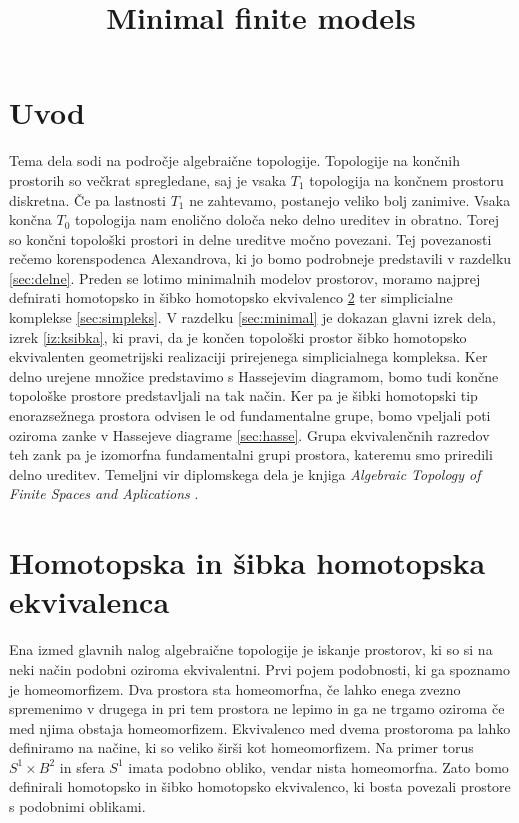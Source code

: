 \documentclass[mat1]{fmfdelo}
\title{Minimal finite models}
\begin{document}
\section{Uvod}

Tema dela sodi na področje algebraične topologije. Topologije na končnih prostorih so večkrat spregledane, saj je vsaka $T_1$ topologija
na končnem prostoru diskretna. Če pa lastnosti $T_1$ ne zahtevamo, postanejo veliko bolj zanimive. Vsaka končna $T_0$ 
topologija nam enolično določa neko delno ureditev in obratno. Torej so končni topološki prostori in delne ureditve močno povezani. Tej povezanosti rečemo korenspodenca Alexandrova, ki jo bomo podrobneje predstavili v razdelku \ref{sec:delne}. Preden se lotimo minimalnih modelov prostorov, moramo najprej 
defnirati homotopsko in šibko homotopsko ekvivalenco \ref{sec:1} ter simplicialne komplekse \ref{sec:simpleks}. V razdelku \ref{sec:minimal} je dokazan glavni izrek dela, izrek \ref{iz:ksibka}, ki pravi, da je končen topološki prostor šibko homotopsko ekvivalenten geometrijski realizaciji 
prirejenega simplicialnega kompleksa. Ker delno urejene množice predstavimo s Hassejevim diagramom, bomo tudi končne topološke prostore predstavljali na tak način. Ker pa je šibki homotopski tip enorazsežnega prostora odvisen le od fundamentalne 
grupe, bomo vpeljali poti oziroma zanke v Hassejeve diagrame \ref{sec:hasse}. Grupa ekvivalenčnih razredov teh zank pa je izomorfna fundamentalni grupi prostora, kateremu smo priredili delno ureditev. Temeljni vir diplomskega dela je knjiga 
\emph{Algebraic Topology of Finite Spaces and Aplications} \cite{barmak}.

\section{Homotopska in šibka homotopska ekvivalenca}\label{sec:1}

Ena izmed glavnih nalog algebraične topologije je iskanje prostorov, ki so si 
na neki način podobni oziroma ekvivalentni. Prvi pojem podobnosti, ki ga spoznamo
je homeomorfizem. Dva prostora sta homeomorfna, če lahko enega zvezno spremenimo v drugega in pri tem prostora ne lepimo in ga ne trgamo oziroma če med njima obstaja homeomorfizem. Ekvivalenco med dvema 
prostoroma pa lahko definiramo na načine, ki so veliko širši kot homeomorfizem.
Na primer torus $S^1\times B^2$ in sfera $S^1$ imata podobno obliko, vendar nista
 homeomorfna. Zato bomo definirali homotopsko in šibko homotopsko ekvivalenco, ki bosta povezali prostore s podobnimi oblikami.
\end{document}
